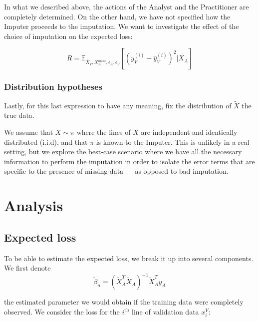 In what we described above, the actions of the Analyst and the Practitioner are completely determined. On the other hand, we have not specified how the Imputer proceeds to the imputation. We want to investigate the effect of the choice of imputation on the expected loss:

$$R = \mathbb{E}_{\tilde{X_V}, X_A^{miss}, \epsilon_A, \epsilon_V}[(y_V^{(i)} - \hat{y}_V^{(i)})^2 \vert X_A]$$ %

			\subsubsection{Distribution hypotheses}
Lastly, for this last expression to have any meaning, fix the distribution of $\tilde{X}$ the true data.

We assume that $X \sim \pi$ where the lines of $X$ are independent and identically distributed (i.i.d), and that $\pi$ is known to the Imputer. This is unlikely in a real setting, but we explore the best-case scenario where we have all the necessary information to perform the imputation in order to isolate the error terms that are specific to the presence of missing data --- as opposed to bad imputation.

	\section{Analysis}
		\subsection{Expected loss}
To be able to estimate the expected loss, we break it up into several components. We first denote 
$$
\tilde{\beta}_n = (\tilde{X}_A^T \tilde{X}_A)^{-1} \tilde{X}_A^T y_A 
$$

the estimated parameter we would obtain if the training data were completely observed. We consider the loss for the $i^{\text{th}}$ line of validation data $x_i^V$:

